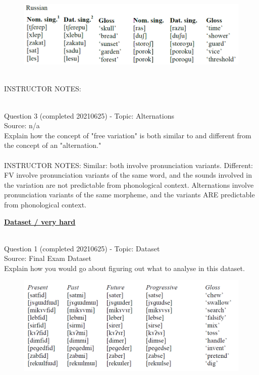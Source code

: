 \documentclass[12pt]{article}
\begin{document}
\begin{figure}[H]
\includegraphics{../images/russian.png}
\end{figure}

~\\
INSTRUCTOR NOTES: 


~\\

{\large Question 3} (completed 20210625) - Topic: Alternations\\
Source: n/a\\

Explain how the concept of "free variation" is both similar to and different from the concept of an "alternation."\\


~\\
INSTRUCTOR NOTES: Similar: both involve pronunciation variants. Different: FV involve pronunciation variants of the same word, and the sounds involved in the variation are not predictable from phonological context. Alternations involve pronunciation variants of the same morpheme, and the variants ARE predictable from phonological context.


\newpage\textbf{\underline{\huge Dataset / very hard\\}}

~\\

{\large Question 1} (completed 20210625) - Topic: Dataset\\
Source: Final Exam Dataset\\

Explain how you would go about figuring out what to analyse in this dataset.\\

\begin{figure}[H]
\includegraphics{../images/final_dataset.png}
\end{figure}
\end{document}
